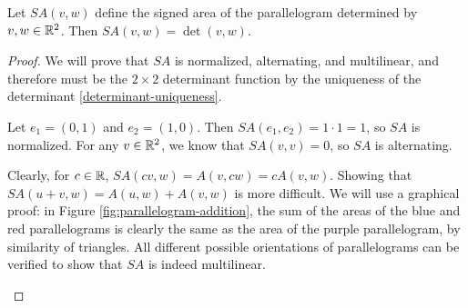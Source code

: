\begin{thm}
    Let $SA(v, w)$ define the signed area of the parallelogram determined by $v, w \in \mathbb{R}^2$. Then $SA(v, w) = \det(v, w)$.
\end{thm}

\begin{proof}
    We will prove that $SA$ is normalized, alternating, and multilinear, and therefore must be the $2 \times 2$ determinant function by the uniqueness of the determinant \ref{determinant-uniqueness}.

    Let $e_1 = (0, 1)$ and $e_2 = (1, 0)$. Then $SA(e_1, e_2) = 1 \cdot 1 = 1$, so $SA$ is normalized. For any $v \in \mathbb{R}^2$, we know that $SA(v, v) = 0$, so $SA$ is alternating.

    Clearly, for $c \in \mathbb{R}$, $SA(cv, w) = A(v, cw) = cA(v, w)$. Showing that $SA(u + v, w) = A(u, w) + A(v, w)$ is more difficult. We will use a graphical proof: in Figure \ref{fig:parallelogram-addition}, the sum of the areas of the blue and red parallelograms is clearly the same as the area of the purple parallelogram, by similarity of triangles. All different possible orientations of parallelograms can be verified to show that $SA$ is indeed multilinear.

    \begin{figure}[ht!]
        \centering
        \begin{minipage}[b]{0.3\linewidth}
        \end{minipage}
        \begin{minipage}[b]{0.3\linewidth}
\end{minipage}
\end{figure}
\end{proof}
